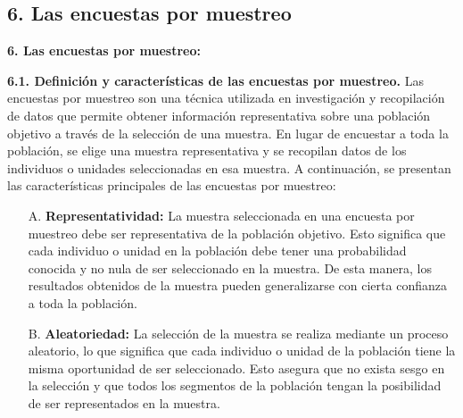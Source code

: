 \documentclass[8pt,a4paper]{beamer}
\begin{document}
{\subsection{6. Las encuestas por muestreo}
\begin{frame}{\textbf{6. Las encuestas por muestreo:}}
\begin{block}{\textbf{6.1. Definición y características de las encuestas por muestreo.}}
\justifying
Las encuestas por muestreo son una técnica utilizada en investigación y recopilación de datos que permite obtener información representativa sobre una población objetivo a través de la selección de una muestra. En lugar de encuestar a toda la población, se elige una muestra representativa y se recopilan datos de los individuos o unidades seleccionadas en esa muestra. A continuación, se presentan las características principales de las encuestas por muestreo:
\begin{enumerate}
\justifying
\item[A.] \textbf{Representatividad:} La muestra seleccionada en una encuesta por muestreo debe ser representativa de la población objetivo. Esto significa que cada individuo o unidad en la población debe tener una probabilidad conocida y no nula de ser seleccionado en la muestra. De esta manera, los resultados obtenidos de la muestra pueden generalizarse con cierta confianza a toda la población.
\item[B.] \textbf{Aleatoriedad:} La selección de la muestra se realiza mediante un proceso aleatorio, lo que significa que cada individuo o unidad de la población tiene la misma oportunidad de ser seleccionado. Esto asegura que no exista sesgo en la selección y que todos los segmentos de la población tengan la posibilidad de ser representados en la muestra.
\end{enumerate}
\end{block}
\end{frame}

\begin{frame}{}
\begin{block}{}
\justifying


\end{block}
\end{frame}}
\end{document}
